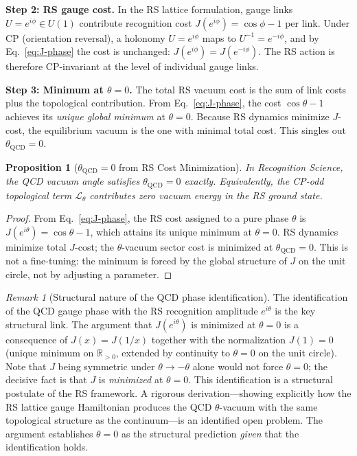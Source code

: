 \documentclass[12pt,a4paper]{article}
\newtheorem{proposition}[theorem]{Proposition}
\theoremstyle{definition}
\theoremstyle{remark}
\newtheorem{remark}[theorem]{Remark}
\begin{document}
\textbf{Step 2: RS gauge cost.}
In the RS lattice formulation, gauge links $U = e^{i\phi} \in U(1)$
contribute recognition cost $J(e^{i\phi}) = \cos\phi - 1$ per link.
Under CP (orientation reversal), a holonomy $U = e^{i\phi}$ maps to
$U^{-1} = e^{-i\phi}$, and by Eq.~\eqref{eq:J-phase} the cost is
unchanged: $J(e^{i\phi}) = J(e^{-i\phi})$.  The RS action is
therefore CP-invariant at the level of individual gauge links.

\textbf{Step 3: Minimum at $\theta = 0$.}
The total RS vacuum cost is the sum of link costs plus the topological
contribution.  From Eq.~\eqref{eq:J-phase}, the cost $\cos\theta - 1$
achieves its \emph{unique global minimum} at $\theta = 0$.  Because
RS dynamics minimize $J$-cost, the equilibrium vacuum is the one with
minimal total cost.  This singles out $\theta_{\mathrm{QCD}} = 0$.

\begin{proposition}[$\theta_{\mathrm{QCD}} = 0$ from RS Cost Minimization]
\label{prop:theta-zero}
In Recognition Science, the QCD vacuum angle satisfies
$\theta_{\mathrm{QCD}} = 0$ exactly.  Equivalently,
the CP-odd topological term $\mathcal{L}_\theta$ contributes zero
vacuum energy in the RS ground state.
\end{proposition}

\begin{proof}
From Eq.~\eqref{eq:J-phase}, the RS cost assigned to a pure phase
$\theta$ is $J(e^{i\theta}) = \cos\theta - 1$, which attains its unique
minimum at $\theta = 0$.  RS dynamics minimize total $J$-cost; the
$\theta$-vacuum sector cost is minimized at $\theta_{\mathrm{QCD}} = 0$.
This is not a fine-tuning: the minimum is forced by the global structure
of $J$ on the unit circle, not by adjusting a parameter.
\end{proof}

\begin{remark}[Structural nature of the QCD phase identification]
\label{rem:structural-identification}
The identification of the QCD gauge phase with the RS recognition
amplitude $e^{i\theta}$ is the key structural link.  The argument
that $J(e^{i\theta})$ is minimized at $\theta = 0$ is a consequence
of $J(x) = J(1/x)$ together with the normalization $J(1) = 0$ (unique
minimum on $\mathbb{R}_{>0}$, extended by continuity to $\theta = 0$
on the unit circle).  Note that $J$ being symmetric under $\theta \to
-\theta$ alone would not force $\theta = 0$; the decisive fact is that
$J$ is \emph{minimized} at $\theta = 0$.
This identification is a structural postulate of the RS framework.
A rigorous derivation---showing explicitly how the RS lattice gauge
Hamiltonian produces the QCD $\theta$-vacuum with the same topological
structure as the continuum---is an identified open problem.  The
argument establishes $\theta = 0$ as the structural prediction
\emph{given} that the identification holds.
\end{remark}
\end{document}
